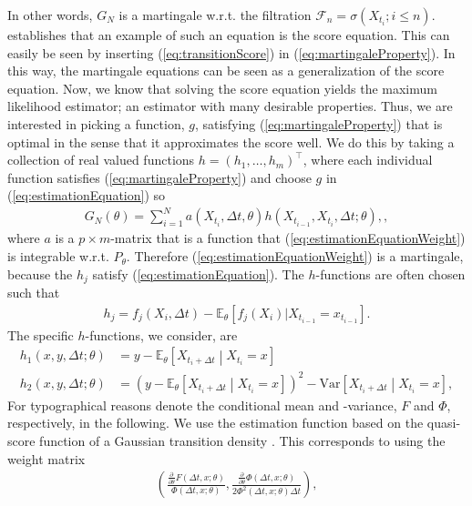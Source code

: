 In other words, $G_N$ is a martingale w.r.t. the filtration $\mathcal{F}_n = \sigma\left(X_{t_i}; i \leq n\right)$. \cite[p. 11]{StatisticalMethodsForSDE} establishes that an example of such an equation is the score equation. This can easily be seen by inserting (\ref{eq:transitionScore}) in (\ref{eq:martingaleProperty}). In this way, the martingale equations can be seen as a generalization of the score equation. Now, we know that solving the score equation yields the maximum likelihood estimator; an estimator with many desirable properties. Thus, we are interested in picking a function, $g$, satisfying (\ref{eq:martingaleProperty}) that is optimal in the sense that it approximates the score well. We do this by taking a collection of real valued functions $h = (h_1, \dots, h_m)^\top$, where each individual function satisfies (\ref{eq:martingaleProperty}) and choose $g$ in (\ref{eq:estimationEquation}) so
\begin{align}
    G_N(\theta) = \sum_{i = 1}^N a\left(X_{t_i}, \Delta t, \theta \right)h(X_{t_{i - 1}}, X_{t_i}, \Delta t; \theta), \label{eq:estimationEquationWeight},
\end{align}
where $a$ is a $p\times m$-matrix that is a function that (\ref{eq:estimationEquationWeight}) is integrable w.r.t. $P_\theta$. Therefore (\ref{eq:estimationEquationWeight}) is a martingale, because the $h_j$ satisfy (\ref{eq:estimationEquation}). The $h$-functions are often chosen such that
\begin{align}
    h_j = f_j(X_i, \Delta t) - \mathbb{E}_\theta\left[f_j(X_i)| X_{t_{i - 1}} = x_{t_{i - 1}}\right].
\end{align}
The specific $h$-functions, we consider, are
\begin{align}
    h_1(x,y, \Delta t; \theta) &= y - \mathbb{E}_\theta\left[X_{t_i + \Delta t} \middle| X_{t_{i}} = x\right] \\
    h_2(x,y, \Delta t; \theta) &= \left(y - \mathbb{E}_\theta\left[X_{t_i + \Delta t} \middle| X_{t_{i}} = x\right]\right)^2 - \mathrm{Var}\left[X_{t_i + \Delta t} \middle| X_{t_{i}} = x\right],
\end{align}
For typographical reasons denote the conditional mean and -variance, $F$ and $\Phi$, respectively, in the following.
 We use the estimation function based on the quasi-score function of a Gaussian transition density \cite[equation (1.28)]{StatisticalMethodsForSDE}. This corresponds to using the weight matrix
 \begin{align}
    \left(\frac{\frac{\partial}{\partial\theta}F(\Delta t, x;\theta)}{\Phi\left(\Delta t, x; \theta\right)} , \frac{\frac{\partial}{\partial\theta}\Phi(\Delta t, x;\theta)}{2\Phi^2(\Delta t, x;\theta)\Delta t} \right),
\end{align}
